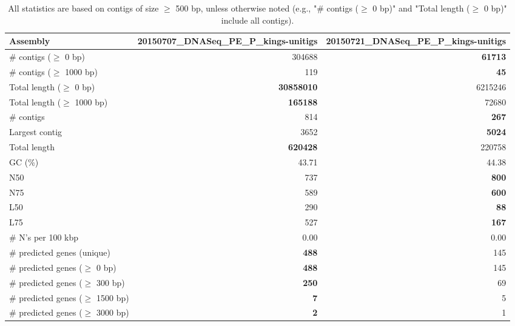 \documentclass[12pt,a4paper]{article}
\begin{document}
\begin{table}[ht]
\begin{center}
\caption{All statistics are based on contigs of size $\geq$ 500 bp, unless otherwise noted (e.g., "\# contigs ($\geq$ 0 bp)" and "Total length ($\geq$ 0 bp)" include all contigs).}
\begin{tabular}{|l*{2}{|r}|}
\hline
Assembly & 20150707\_DNASeq\_PE\_P\_kings-unitigs & 20150721\_DNASeq\_PE\_P\_kings-unitigs \\ \hline
\# contigs ($\geq$ 0 bp) & 304688 & {\bf 61713} \\ \hline
\# contigs ($\geq$ 1000 bp) & 119 & {\bf 45} \\ \hline
Total length ($\geq$ 0 bp) & {\bf 30858010} & 6215246 \\ \hline
Total length ($\geq$ 1000 bp) & {\bf 165188} & 72680 \\ \hline
\# contigs & 814 & {\bf 267} \\ \hline
Largest contig & 3652 & {\bf 5024} \\ \hline
Total length & {\bf 620428} & 220758 \\ \hline
GC (\%) & 43.71 & 44.38 \\ \hline
N50 & 737 & {\bf 800} \\ \hline
N75 & 589 & {\bf 600} \\ \hline
L50 & 290 & {\bf 88} \\ \hline
L75 & 527 & {\bf 167} \\ \hline
\# N's per 100 kbp & 0.00 & 0.00 \\ \hline
\# predicted genes (unique) & {\bf 488} & 145 \\ \hline
\# predicted genes ($\geq$ 0 bp) & {\bf 488} & 145 \\ \hline
\# predicted genes ($\geq$ 300 bp) & {\bf 250} & 69 \\ \hline
\# predicted genes ($\geq$ 1500 bp) & {\bf 7} & 5 \\ \hline
\# predicted genes ($\geq$ 3000 bp) & {\bf 2} & 1 \\ \hline
\end{tabular}
\end{center}
\end{table}
\end{document}

